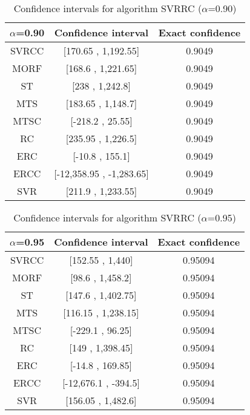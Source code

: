 \documentclass[a4paper,10pt]{article}
\begin{document}
\begin{table}[!htp]
\centering\small
\begin{tabular}{
|c|c|c|}
\hline
 $\alpha$=0.90 & Confidence interval & Exact confidence \\ \hline 
SVRCC & [170.65 , 1,192.55] & 0.9049\\ \hline 
MORF & [168.6 , 1,221.65] & 0.9049\\ \hline 
ST & [238 , 1,242.8] & 0.9049\\ \hline 
MTS & [183.65 , 1,148.7] & 0.9049\\ \hline 
MTSC & [-218.2 , 25.55] & 0.9049\\ \hline 
RC & [235.95 , 1,226.5] & 0.9049\\ \hline 
ERC & [-10.8 , 155.1] & 0.9049\\ \hline 
ERCC & [-12,358.95 , -1,283.65] & 0.9049\\ \hline 
SVR & [211.9 , 1,233.55] & 0.9049\\ \hline 

\end{tabular}
\caption{Confidence intervals for algorithm SVRRC ($\alpha$=0.90)}
\end{table}
\begin{table}[!htp]
\centering\small
\begin{tabular}{
|c|c|c|}
\hline
 $\alpha$=0.95 & Confidence interval & Exact confidence \\ \hline 
SVRCC & [152.55 , 1,440] & 0.95094\\ \hline 
MORF & [98.6 , 1,458.2] & 0.95094\\ \hline 
ST & [147.6 , 1,402.75] & 0.95094\\ \hline 
MTS & [116.15 , 1,238.15] & 0.95094\\ \hline 
MTSC & [-229.1 , 96.25] & 0.95094\\ \hline 
RC & [149 , 1,398.45] & 0.95094\\ \hline 
ERC & [-14.8 , 169.85] & 0.95094\\ \hline 
ERCC & [-12,676.1 , -394.5] & 0.95094\\ \hline 
SVR & [156.05 , 1,482.6] & 0.95094\\ \hline 

\end{tabular}
\caption{Confidence intervals for algorithm SVRRC ($\alpha$=0.95)}
\end{table}

 \clearpage 
\end{document}
